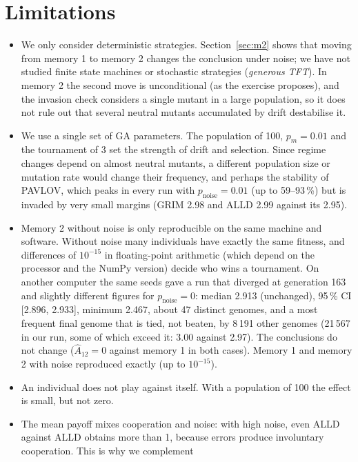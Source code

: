\documentclass[10pt,a4paper]{article}
\newcommand{\pn}{p_{\text{noise}}}
\newcommand{\Atwelve}{\hat{A}_{12}}
\begin{document}
\section{Limitations}
\begin{itemize}
  \item We only consider deterministic strategies. Section~\ref{sec:m2} shows that moving from memory 1 to
        memory 2 changes the conclusion under noise; we have not studied finite state machines or
        stochastic strategies (\emph{generous TFT}). In memory 2 the second move is unconditional (as the
        exercise proposes), and the invasion check considers a single mutant in a large population, so it
        does not rule out that several neutral mutants accumulated by drift destabilise it.
  \item We use a single set of GA parameters. The population of 100, $p_m=0.01$ and the tournament of 3
        set the strength of drift and selection. Since regime changes depend on almost neutral mutants, a
        different population size or mutation rate would change their frequency, and perhaps the stability
        of PAVLOV, which peaks in every run with $\pn=0.01$ (up to 59--93\,\%) but is invaded by very small margins
        (GRIM 2.98 and ALLD 2.99 against its 2.95).
  \item Memory 2 without noise is only reproducible on the same machine and software. Without noise many
        individuals have exactly the same fitness, and differences of $10^{-15}$ in floating-point
        arithmetic (which depend on the processor and the NumPy version) decide who wins a tournament. On
        another computer the same seeds gave a run that diverged at generation 163 and slightly different
        figures for $\pn=0$: median 2.913 (unchanged), 95\,\% CI [2.896, 2.933], minimum 2.467, about 47
        distinct genomes, and a most frequent final genome that is tied, not beaten, by 8\,191 other genomes
        (21\,567 in our run, some of which exceed it: 3.00 against 2.97). The conclusions do not change
        ($\Atwelve=0$ against memory 1 in both cases). Memory 1 and memory 2 with noise reproduced exactly (up to $10^{-15}$).
  \item An individual does not play against itself. With a population of 100 the
        effect is small, but not zero.
  \item The mean payoff mixes cooperation and noise: with high noise, even ALLD against ALLD
        obtains more than 1, because errors produce involuntary cooperation. This is why we complement

\end{itemize}
\end{document}
